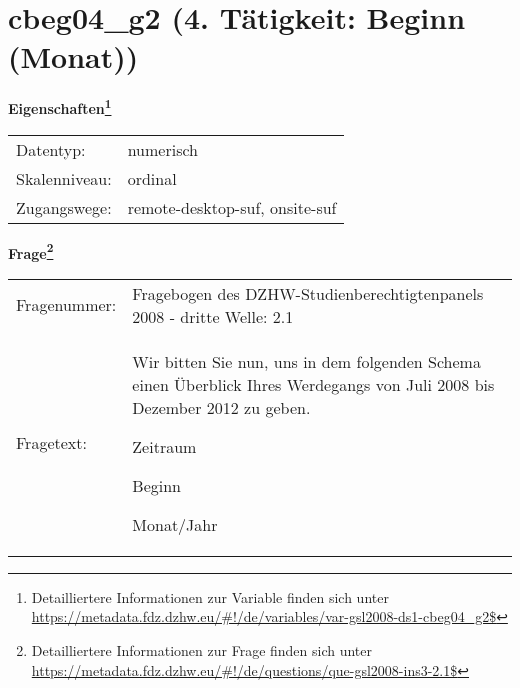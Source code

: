 
    \setcounter{footnote}{0}

    \vspace*{-1.8cm}
	\section{cbeg04\_g2 (4. Tätigkeit: Beginn (Monat))}
	\label{section:cbeg04_g2}



    \vspace*{0.5cm}
    \noindent\textbf{Eigenschaften\footnote{Detailliertere Informationen zur Variable finden sich unter
		\url{https://metadata.fdz.dzhw.eu/\#!/de/variables/var-gsl2008-ds1-cbeg04_g2$}}}\\
	\begin{tabularx}{\hsize}{@{}lX}
	Datentyp: & numerisch \\
	Skalenniveau: & ordinal \\
	Zugangswege: &
	  remote-desktop-suf, 
	  onsite-suf
 \\
    \end{tabularx}



				\vspace*{0.5cm}
                \noindent\textbf{Frage\footnote{Detailliertere Informationen zur Frage finden sich unter
		              \url{https://metadata.fdz.dzhw.eu/\#!/de/questions/que-gsl2008-ins3-2.1$}}}\\
				\begin{tabularx}{\hsize}{@{}lX}
					Fragenummer: &
					  Fragebogen des DZHW-Studienberechtigtenpanels 2008 - dritte Welle:
					  2.1
 \\
					Fragetext: & Wir bitten Sie nun, uns in dem folgenden Schema einen Überblick Ihres Werdegangs von Juli 2008 bis Dezember 2012 zu geben.\par  Zeitraum\par  Beginn\par  Monat/Jahr \\
				\end{tabularx}





